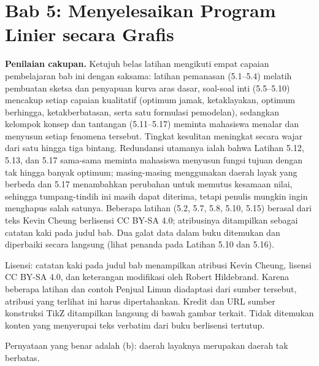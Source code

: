 \section{Bab 5: Menyelesaikan Program Linier secara Grafis}

\textbf{Penilaian cakupan.} Ketujuh belas latihan mengikuti empat capaian pembelajaran bab ini dengan saksama: latihan pemanasan (5.1--5.4) melatih pembuatan sketsa dan penyapuan kurva aras dasar, soal-soal inti (5.5--5.10) mencakup setiap capaian kualitatif (optimum jamak, ketaklayakan, optimum berhingga, ketakberbatasan, serta satu formulasi pemodelan), sedangkan kelompok konsep dan tantangan (5.11--5.17) meminta mahasiswa menalar dan menyusun setiap fenomena tersebut. Tingkat kesulitan meningkat secara wajar dari satu hingga tiga bintang. Redundansi utamanya ialah bahwa Latihan 5.12, 5.13, dan 5.17 sama-sama meminta mahasiswa menyusun fungsi tujuan dengan tak hingga banyak optimum; masing-masing menggunakan daerah layak yang berbeda dan 5.17 menambahkan perubahan untuk memutus kesamaan nilai, sehingga tumpang-tindih ini masih dapat diterima, tetapi penulis mungkin ingin menghapus salah satunya. Beberapa latihan (5.2, 5.7, 5.8, 5.10, 5.15) berasal dari teks Kevin Cheung berlisensi CC BY-SA 4.0; atribusinya ditampilkan sebagai catatan kaki pada judul bab. Dua galat data dalam buku ditemukan dan diperbaiki secara langsung (lihat penanda pada Latihan 5.10 dan 5.16).

\begin{qaflag}
Lisensi: catatan kaki pada judul bab menampilkan atribusi Kevin Cheung, lisensi CC BY-SA 4.0, dan keterangan modifikasi oleh Robert Hildebrand. Karena beberapa latihan dan contoh Penjual Limun diadaptasi dari sumber tersebut, atribusi yang terlihat ini harus dipertahankan. Kredit dan URL sumber konstruksi TikZ ditampilkan langsung di bawah gambar terkait. Tidak ditemukan konten yang menyerupai teks verbatim dari buku berlisensi tertutup.
\end{qaflag}

Pernyataan yang benar adalah (b): daerah layaknya merupakan daerah tak berbatas.

